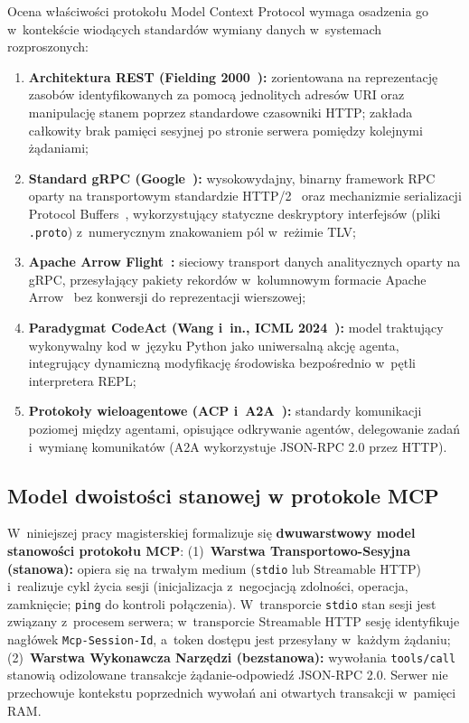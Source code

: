 Ocena właściwości protokołu Model Context Protocol wymaga osadzenia go w~kontekście wiodących standardów wymiany danych w~systemach rozproszonych:
\begin{enumerate}
    \item \textbf{Architektura REST (Fielding 2000~\cite{fielding2000rest}):} zorientowana na reprezentację zasobów identyfikowanych za pomocą jednolitych adresów URI oraz manipulację stanem poprzez standardowe czasowniki HTTP; zakłada całkowity brak pamięci sesyjnej po stronie serwera pomiędzy kolejnymi żądaniami;
    \item \textbf{Standard gRPC (Google~\cite{grpc_spec}):} wysokowydajny, binarny framework RPC oparty na transportowym standardzie HTTP/2~\cite{rfc7540_http2} oraz mechanizmie serializacji Protocol Buffers~\cite{protobuf_spec}, wykorzystujący statyczne deskryptory interfejsów (pliki \texttt{.proto}) z~numerycznym znakowaniem pól w~reżimie TLV;
    \item \textbf{Apache Arrow Flight~\cite{arrow_flight}:} sieciowy transport danych analitycznych oparty na gRPC, przesyłający pakiety rekordów w~kolumnowym formacie Apache Arrow~\cite{apache_arrow} bez konwersji do reprezentacji wierszowej;
    \item \textbf{Paradygmat CodeAct (Wang i~in., ICML 2024~\cite{wang2024codeact}):} model traktujący wykonywalny kod w~języku Python jako uniwersalną akcję agenta, integrujący dynamiczną modyfikację środowiska bezpośrednio w~pętli interpretera REPL;
    \item \textbf{Protokoły wieloagentowe (ACP i~A2A~\cite{survey_agent_interoperability_2025}):} standardy komunikacji poziomej między agentami, opisujące odkrywanie agentów, delegowanie zadań i~wymianę komunikatów (A2A wykorzystuje JSON-RPC 2.0 przez HTTP).
\end{enumerate}

\subsection{Model dwoistości stanowej w protokole MCP}
\label{subsec:protokoly_dwoistosc_stanowa}

W~niniejszej pracy magisterskiej formalizuje się \textbf{dwuwarstwowy model stanowości protokołu MCP}:
(1)~\textbf{Warstwa Transportowo-Sesyjna (stanowa):} opiera się na trwałym medium (\texttt{stdio} lub Streamable HTTP) i~realizuje cykl życia sesji (inicjalizacja z~negocjacją zdolności, operacja, zamknięcie; \texttt{ping} do kontroli połączenia). W~transporcie \texttt{stdio} stan sesji jest związany z~procesem serwera; w~transporcie Streamable HTTP sesję identyfikuje nagłówek \texttt{Mcp-Session-Id}, a~token dostępu jest przesyłany w~każdym żądaniu;
(2)~\textbf{Warstwa Wykonawcza Narzędzi (bezstanowa):} wywołania \texttt{tools/call} stanowią odizolowane transakcje żądanie-odpowiedź JSON-RPC 2.0. Serwer nie przechowuje kontekstu poprzednich wywołań ani otwartych transakcji w~pamięci RAM.

